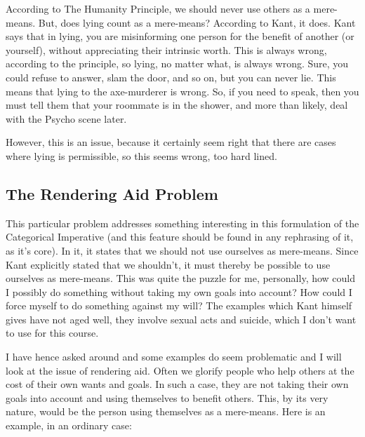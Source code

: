 According to The Humanity Principle, we should never use others as a mere-means. But, does lying count as a mere-means? According to Kant, it does. Kant says that in lying, you are misinforming one person for the benefit of another (or yourself), without appreciating their intrinsic worth. This is always wrong, according to the principle, so lying, no matter what, is always wrong. Sure, you could refuse to answer, slam the door, and so on, but you can never lie. This means that lying to the axe-murderer is wrong. So, if you need to speak, then you must tell them that your roommate is in the shower, and more than likely, deal with the Psycho scene later. 

However, this is an issue, because it certainly seem right that there are cases where lying is permissible, so this seems wrong, too hard lined. 
\subsection{The Rendering Aid Problem}

This particular problem addresses something interesting in this formulation of the Categorical Imperative (and this feature should be found in any rephrasing of it, as it's core). In it, it states that we should not use ourselves as mere-means. Since Kant explicitly stated that we shouldn't, it must thereby be possible to use ourselves as mere-means. This was quite the puzzle for me, personally, how could I possibly do something without taking my own goals into account? How could I force myself to do something against my will? The examples which Kant himself gives have not aged well, they involve sexual acts and suicide, which I don't want to use for this course. 

I have hence asked around and some examples do seem problematic and I will look at the issue of rendering aid. Often we glorify people who help others at the cost of their own wants and goals. In such a case, they are not taking their own goals into account and using themselves to benefit others. This, by its very nature, would be the person using themselves as a mere-means. Here is an example, in an ordinary case:


